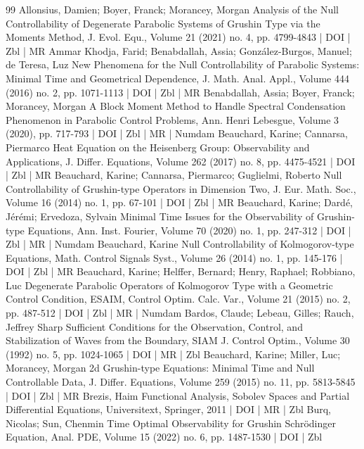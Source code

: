 \begin{thebibliography}{99}
Allonsius, Damien; Boyer, Franck; Morancey, Morgan Analysis of the Null Controllability of Degenerate Parabolic Systems of Grushin Type via the Moments Method, J. Evol. Equ., Volume 21 (2021) no. 4, pp. 4799-4843 | DOI | Zbl | MR
Ammar Khodja, Farid; Benabdallah, Assia; González-Burgos, Manuel; de Teresa, Luz New Phenomena for the Null Controllability of Parabolic Systems: Minimal Time and Geometrical Dependence, J. Math. Anal. Appl., Volume 444 (2016) no. 2, pp. 1071-1113 | DOI | Zbl | MR
Benabdallah, Assia; Boyer, Franck; Morancey, Morgan A Block Moment Method to Handle Spectral Condensation Phenomenon in Parabolic Control Problems, Ann. Henri Lebesgue, Volume 3 (2020), pp. 717-793 | DOI | Zbl | MR | Numdam
Beauchard, Karine; Cannarsa, Piermarco Heat Equation on the Heisenberg Group: Observability and Applications, J. Differ. Equations, Volume 262 (2017) no. 8, pp. 4475-4521 | DOI | Zbl | MR
Beauchard, Karine; Cannarsa, Piermarco; Guglielmi, Roberto Null Controllability of Grushin-type Operators in Dimension Two, J. Eur. Math. Soc., Volume 16 (2014) no. 1, pp. 67-101 | DOI | Zbl | MR
Beauchard, Karine; Dardé, Jérémi; Ervedoza, Sylvain Minimal Time Issues for the Observability of Grushin-type Equations, Ann. Inst. Fourier, Volume 70 (2020) no. 1, pp. 247-312 | DOI | Zbl | MR | Numdam
Beauchard, Karine Null Controllability of Kolmogorov-type Equations, Math. Control Signals Syst., Volume 26 (2014) no. 1, pp. 145-176 | DOI | Zbl | MR
Beauchard, Karine; Helffer, Bernard; Henry, Raphael; Robbiano, Luc Degenerate Parabolic Operators of Kolmogorov Type with a Geometric Control Condition, ESAIM, Control Optim. Calc. Var., Volume 21 (2015) no. 2, pp. 487-512 | DOI | Zbl | MR | Numdam
Bardos, Claude; Lebeau, Gilles; Rauch, Jeffrey Sharp Sufficient Conditions for the Observation, Control, and Stabilization of Waves from the Boundary, SIAM J. Control Optim., Volume 30 (1992) no. 5, pp. 1024-1065 | DOI | MR | Zbl
Beauchard, Karine; Miller, Luc; Morancey, Morgan 2d Grushin-type Equations: Minimal Time and Null Controllable Data, J. Differ. Equations, Volume 259 (2015) no. 11, pp. 5813-5845 | DOI | Zbl | MR
Brezis, Haim Functional Analysis, Sobolev Spaces and Partial Differential Equations, Universitext, Springer, 2011 | DOI | MR | Zbl
Burq, Nicolas; Sun, Chenmin Time Optimal Observability for Grushin Schrödinger Equation, Anal. PDE, Volume 15 (2022) no. 6, pp. 1487-1530 | DOI | Zbl

\end{thebibliography}

